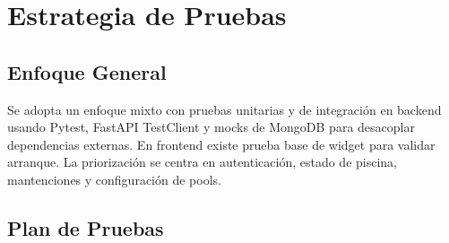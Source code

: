 \documentclass[11pt, a4paper]{article}
\begin{document}
\section{Estrategia de Pruebas}

\subsection{Enfoque General}

Se adopta un enfoque mixto con pruebas unitarias y de integración en backend usando Pytest, FastAPI TestClient y mocks de MongoDB para desacoplar dependencias externas. En frontend existe prueba base de widget para validar arranque. La priorización se centra en autenticación, estado de piscina, mantenciones y configuración de pools.

\subsection{Plan de Pruebas}
\end{document}
